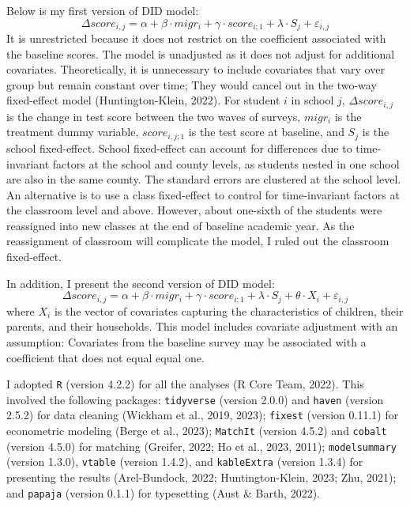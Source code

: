 \documentclass[
  man,floatsintext]{apa7}
\begin{document}
Below is my first version of DID model: \[\Delta score_{i,j} = \alpha + \beta \cdot migr_{i} + \gamma \cdot score_{i;1} + \lambda \cdot S_{j} + \varepsilon_{i,j}\] It is unrestricted because it does not restrict on the coefficient associated with the baseline scores. The model is unadjusted as it does not adjust for additional covariates. Theoretically, it is unnecessary to include covariates that vary over group but remain constant over time; They would cancel out in the two-way fixed-effect model (Huntington-Klein, 2022). For student \(i\) in school \(j\), \(\Delta score_{i,j}\) is the change in test score between the two waves of surveys, \(migr_{i}\) is the treatment dummy variable, \(score_{i,j;1}\) is the test score at baseline, and \(S_{j}\) is the school fixed-effect. School fixed-effect can account for differences due to time-invariant factors at the school and county levels, as students nested in one school are also in the same county. The standard errors are clustered at the school level. An alternative is to use a class fixed-effect to control for time-invariant factors at the classroom level and above. However, about one-sixth of the students were reassigned into new classes at the end of baseline academic year. As the reassignment of classroom will complicate the model, I ruled out the classroom fixed-effect.

In addition, I present the second version of DID model: \[\Delta score_{i,j} = \alpha + \beta \cdot migr_{i} + \gamma \cdot score_{i;1} + \lambda \cdot S_{j} + \theta \cdot X_{i} + \varepsilon_{i,j}\] where \(X_{i}\) is the vector of covariates capturing the characteristics of children, their parents, and their households. This model includes covariate adjustment with an assumption: Covariates from the baseline survey may be associated with a coefficient that does not equal equal one.

I adopted \texttt{R} (version 4.2.2) for all the analyses (R Core Team, 2022). This involved the following packages: \texttt{tidyverse} (version 2.0.0) and \texttt{haven} (version 2.5.2) for data cleaning (Wickham et al., 2019, 2023); \texttt{fixest} (version 0.11.1) for econometric modeling (Berge et al., 2023); \texttt{MatchIt} (version 4.5.2) and \texttt{cobalt} (version 4.5.0) for matching (Greifer, 2022; Ho et al., 2023, 2011); \texttt{modelsummary} (version 1.3.0), \texttt{vtable} (version 1.4.2), and \texttt{kableExtra} (version 1.3.4) for presenting the results (Arel-Bundock, 2022; Huntington-Klein, 2023; Zhu, 2021); and \texttt{papaja} (version 0.1.1) for typesetting (Aust \& Barth, 2022).
\end{document}
